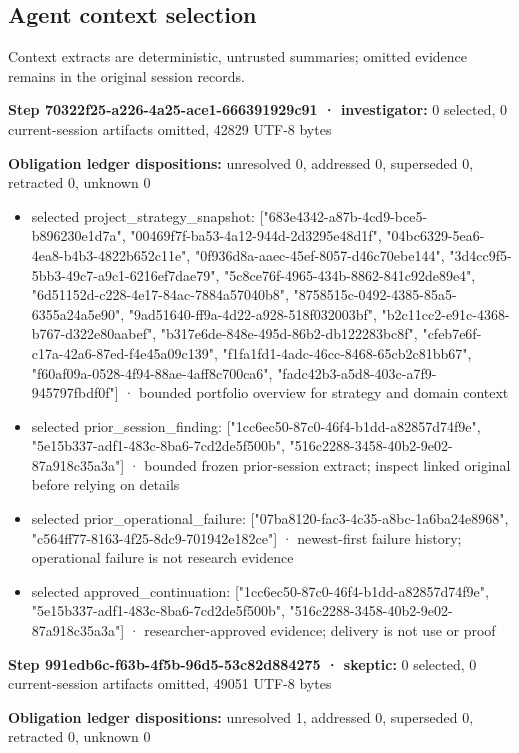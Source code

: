 \documentclass[11pt]{article}
\begin{document}
\subsection{Agent context selection}
Context extracts are deterministic, untrusted summaries; omitted evidence remains in the original session records.\par
\textbf{Step 70322f25-a226-4a25-ace1-666391929c91 · investigator:} 0 selected, 0 current-session artifacts omitted, 42829 UTF-8 bytes\par
\textbf{Obligation ledger dispositions:} unresolved 0, addressed 0, superseded 0, retracted 0, unknown 0\par
\begin{itemize}
\item selected project\_strategy\_snapshot: ["683e4342-a87b-4cd9-bce5-b896230e1d7a", "00469f7f-ba53-4a12-944d-2d3295e48d1f", "04bc6329-5ea6-4ea8-b4b3-4822b652c11e", "0f936d8a-aaec-45ef-8057-d46c70ebe144", "3d4cc9f5-5bb3-49c7-a9c1-6216ef7dae79", "5c8ce76f-4965-434b-8862-841c92de89e4", "6d51152d-c228-4e17-84ac-7884a57040b8", "8758515c-0492-4385-85a5-6355a24a5e90", "9ad51640-ff9a-4d22-a928-518f032003bf", "b2c11cc2-e91c-4368-b767-d322e80aabef", "b317e6de-848e-495d-86b2-db122283bc8f", "cfeb7e6f-c17a-42a6-87ed-f4e45a09c139", "f1fa1fd1-4adc-46cc-8468-65cb2c81bb67", "f60af09a-0528-4f94-88ae-4aff8c700ca6", "fadc42b3-a5d8-403c-a7f9-945797fbdf0f"] · bounded portfolio overview for strategy and domain context
\item selected prior\_session\_finding: ["1cc6ec50-87c0-46f4-b1dd-a82857d74f9e", "5e15b337-adf1-483c-8ba6-7cd2de5f500b", "516c2288-3458-40b2-9e02-87a918c35a3a"] · bounded frozen prior-session extract; inspect linked original before relying on details
\item selected prior\_operational\_failure: ["07ba8120-fac3-4c35-a8bc-1a6ba24e8968", "c564ff77-8163-4f25-8dc9-701942e182ce"] · newest-first failure history; operational failure is not research evidence
\item selected approved\_continuation: ["1cc6ec50-87c0-46f4-b1dd-a82857d74f9e", "5e15b337-adf1-483c-8ba6-7cd2de5f500b", "516c2288-3458-40b2-9e02-87a918c35a3a"] · researcher-approved evidence; delivery is not use or proof
\end{itemize}
\textbf{Step 991edb6c-f63b-4f5b-96d5-53c82d884275 · skeptic:} 0 selected, 0 current-session artifacts omitted, 49051 UTF-8 bytes\par
\textbf{Obligation ledger dispositions:} unresolved 1, addressed 0, superseded 0, retracted 0, unknown 0\par
\end{document}
